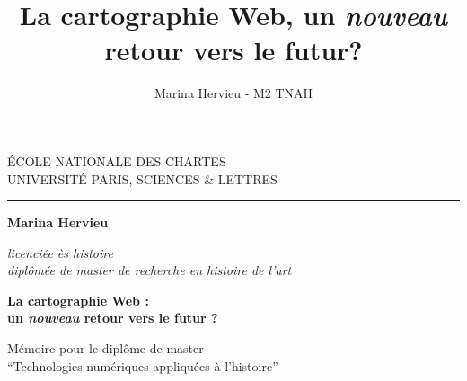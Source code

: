 \documentclass[openany, a4paper, 12pt, twoside]{book}
\author{Marina Hervieu - M2 TNAH}
\title{La cartographie Web, un \textit{nouveau} retour vers le futur?}
\begin{document}
\hypersetup{pdfborder=0 0 0}
	\begin{titlepage}
		\begin{center}
			
			\bigskip
			
			\begin{large}				
				ÉCOLE NATIONALE DES CHARTES\\
				UNIVERSITÉ PARIS, SCIENCES \& LETTRES
			\end{large}
			\begin{center}\rule{2cm}{0.02cm}\end{center}
			
			\bigskip
			\bigskip
			\bigskip
			\begin{Large}
				\textbf{Marina Hervieu}\\
			\end{Large}
			\begin{normalsize} \textit{licenciée ès histoire}\\
				\textit{diplômée de master de recherche en histoire de l'art}
			\end{normalsize}
			
			\bigskip
			\bigskip
			\bigskip
			
			\begin{Huge}
				\textbf{La cartographie Web : \\un \textit{nouveau} retour vers le futur ?}\\
			\end{Huge}
			\bigskip
			\bigskip
			
			\bigskip
			\bigskip
			\bigskip
			\vfill
			
			\begin{large}
				Mémoire 
				pour le diplôme de master \\
				\enquote{Technologies numériques appliquées à l'histoire} \\
			\end{large}
			
		\end{center}
	\end{titlepage}
 
\end{document}
